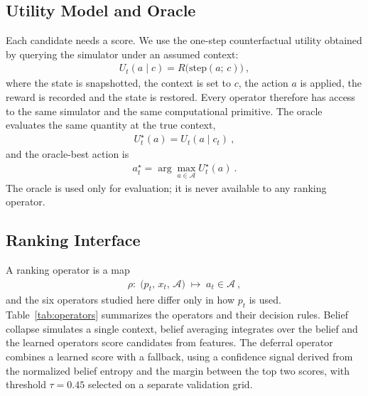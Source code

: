 \documentclass[journal]{IEEEtran}
\begin{document}
\subsection{Utility Model and Oracle}
\label{sec:utility}

Each candidate needs a score.
We use the one-step counterfactual utility obtained by querying the simulator under an assumed context:
\begin{align}
\label{eq:utility}
U_t(a\mid c)=R\big(\mathrm{step}(a;\,c)\big)\:,
\end{align}
where the state is snapshotted, the context is set to \(c\), the action \(a\) is applied, the reward is recorded and the state is restored.
Every operator therefore has access to the same simulator and the same computational primitive.
The oracle evaluates the same quantity at the true context,
\begin{align}
\label{eq:oracle}
U_t^\star(a)=U_t(a\mid c_t)\:,
\end{align}
and the oracle-best action is
\begin{align}
\label{eq:bestaction}
a_t^\star=\arg\max_{a\in\mathcal{A}} U_t^\star(a)\:.
\end{align}
The oracle is used only for evaluation; it is never available to any ranking operator.

\subsection{Ranking Interface}
\label{sec:interface}

A ranking operator is a map
\begin{align}
\label{eq:operator}
\rho:\;\big(p_t,\,x_t,\,\mathcal{A}\big)\;\mapsto\;a_t\in\mathcal{A}\:,
\end{align}
and the six operators studied here differ only in how \(p_t\) is used.
Table~\ref{tab:operators} summarizes the operators and their decision rules.
Belief collapse simulates a single context, belief averaging integrates over the belief and the learned operators score candidates from features.
The deferral operator combines a learned score with a fallback, using a confidence signal derived from the normalized belief entropy and the margin between the top two scores, with threshold \(\tau=0.45\) selected on a separate validation grid.
\end{document}
